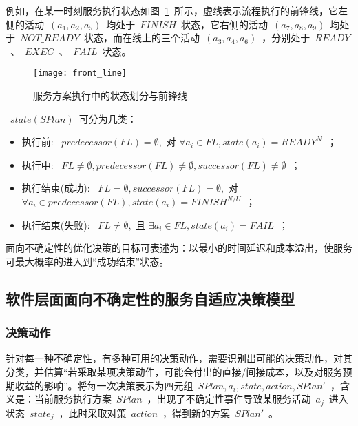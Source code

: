 例如，在某一时刻服务执行状态如图~\ref{figure:front_line}~所示，虚线表示流程执行的前锋线，它左侧的活动~$(a_1, a_2, a_5)$~均处于~$FINISH$~状态，它右侧的活动~$(a_7, a_8, a_9)$~均处于~$NOT\_READY$~状态，而在线上的三个活动~$(a_3, a_4, a_6)$~，分别处于~$READY$~、~$EXEC$~、~$FAIL$~状态。

\begin{figure}[htbp]
    \centering
    \texttt{[image: front\_line]}
    \caption{服务方案执行中的状态划分与前锋线}\label{figure:front_line}
    \vspace{-1em}
\end{figure}

~$state(SPlan)$~可分为几类：
\begin{itemize}
\item 执行前: ~$predecessor(FL) = \emptyset ,$ 对 $ \forall {a_i} \in FL,state({a_i}) = READ{Y^N}$~；
\item 执行中: ~$FL \ne \emptyset ,predecessor(FL) \ne \emptyset ,successor(FL) \ne \emptyset $~；
\item 执行结束(成功): ~$FL = \emptyset ,successor(FL) = \emptyset ,$ 对 $\forall {a_i} \in predecessor(FL),state({a_i}) = FINIS{H^{N/U}}$~；
\item 执行结束(失败): ~$FL \ne \emptyset ,$ 且 $\exists {a_i} \in FL,state({a_i}) = FAIL$~；
\end{itemize}

面向不确定性的优化决策的目标可表述为：以最小的时间延迟和成本溢出，使服务可最大概率的进入到“成功结束”状态。

\subsection{软件层面面向不确定性的服务自适应决策模型}

\subsubsection{决策动作}

针对每一种不确定性，有多种可用的决策动作，需要识别出可能的决策动作，对其分类，并估算“若采取某项决策动作，可能会付出的直接/间接成本，以及对服务预期收益的影响”。将每一次决策表示为四元组~$SPlan,{a_i},state,action,SPlan'$~，含义是：当前服务执行方案~$SPlan$~，出现了不确定性事件导致某服务活动~$a_j$~进入状态~$state_j$~，此时采取对策~$action$~，得到新的方案~$SPlan'$~。

